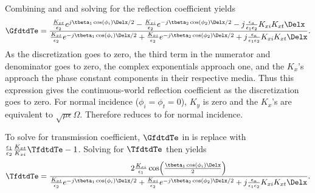 Combining  and  and solving
for the reflection coefficient yields
\begin{equation}
  \GfdtdTe = \frac
  {\frac{K_{xt}}{\epsilon_2}e^{j \tbeta_1 \cos(\phi_i)\Delx/2} -
   \frac{K_{xi}}{\epsilon_2}e^{-j \tbeta_2 \cos(\phi_2)\Delx/2} -
   j\frac{\epsilon_a}{\epsilon_1\epsilon_2} K_{xi}K_{xt} \Delx}
  {\frac{K_{xt}}{\epsilon_2}e^{-j \tbeta_1 \cos(\phi_i)\Delx/2} +
   \frac{K_{xi}}{\epsilon_2}e^{-j \tbeta_2 \cos(\phi_2)\Delx/2} +
   j\frac{\epsilon_a}{\epsilon_1\epsilon_2} K_{xi}K_{xt} \Delx}.
  \label{eq:gammaTeY}
\end{equation}
As the discretization goes to zero, the third term in the numerator
and denominator goes to zero, the complex exponentials approach one,
and the $K_x$'s approach the phase constant components in their
respective media.  Thus this expression gives the continuous-world
reflection coefficient as the discretization goes to zero.  For normal
incidence ($\phi_i=\phi_t=0$), $K_y$ is zero and the $K_x$'s are
equivalent to $\sqrt{\mu\epsilon}\Omega$.  Therefore
 reduces to  for normal
incidence.

To solve for transmission coefficient, $\GfdtdTe$ in
 is replace with
$\frac{\epsilon_1}{\epsilon_2}\frac{K_{xt}}{K_{xi}}\TfdtdTe -1$.
Solving for $\TfdtdTe$ then yields
\begin{equation}
  \TfdtdTe = \frac{2\frac{K_{xi}}{\epsilon_1}
  \cos\!\left(\frac{\tbeta_1 \cos(\phi_i)\Delx}{2}\right)}
  {\frac{K_{xt}}{\epsilon_2}e^{-j \tbeta_1 \cos(\phi_i)\Delx/2} +
   \frac{K_{xi}}{\epsilon_2}e^{-j \tbeta_2 \cos(\phi_2)\Delx/2} +
   j\frac{\epsilon_a}{\epsilon_1\epsilon_2} K_{xi}K_{xt} \Delx}.
  \label{eq:transTeY}
\end{equation}

